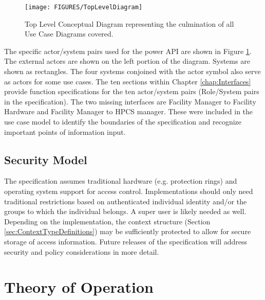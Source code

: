 \documentclass[12pt]{report} %
\begin{document}
\begin{figure}[!ht]
    \begin{center}
\texttt{[image: FIGURES/TopLevelDiagram]}
    \end{center}
\caption{Top Level Conceptual Diagram representing the culmination of all Use Case Diagrams covered.}
\label{fig:UCDTopLevel}
\end{figure}

The specific actor/system pairs used for the power API are shown in Figure \ref{fig:UCDTopLevel}.
The external actors are shown on the left portion of the diagram. 
Systems are shown as rectangles. 
The four systems conjoined with the actor symbol also serve as actors for some use cases. 
The ten sections within Chapter \ref{chap:Interfaces} provide function specifications for the ten actor/system pairs (Role/System pairs in the specification).
The two missing interfaces are Facility Manager to Facility Hardware and Facility Manager to HPCS manager.
These were included in the use case model to identify the boundaries of the specification and recognize important points of information input. 

\section{Security Model}\label{sec:SecModel}
The specification assumes traditional hardware (e.g. protection rings) and operating system support for access control.
Implementations should only need traditional restrictions based on authenticated individual identity and/or the groups to which the individual belongs.
A super user is likely needed as well.
Depending on the implementation, the context structure (Section \ref{sec:ContextTypeDefinitions}) may be sufficiently protected to allow for secure storage of access information. Future releases of the specification will address security and policy considerations in more detail.


	\chapter{Theory of Operation}\label{chap:Theory}

\end{document}
